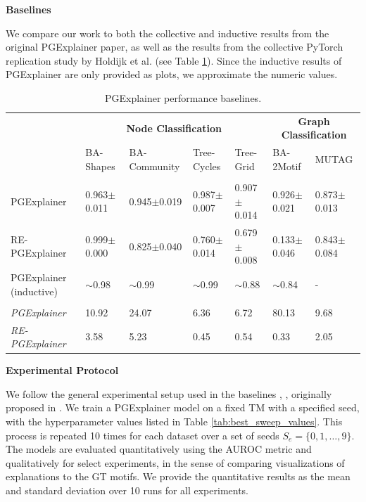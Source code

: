 \textbf{Baselines}\par
 We compare our work to both the collective and inductive results from the original PGExplainer paper, as well as the results from the collective PyTorch replication study by Holdijk et al. \cite{holdijk2021re} (see Table \ref{tab:pgexplainer_baseline}). Since the inductive results of PGExplainer are only provided as plots, we approximate the numeric values. \bigskip

\begin{table}[ht]
    \centering
    \scriptsize
    \begin{tabularx}{\textwidth}{l|XXXX|XX}   %
    \multicolumn{1}{c}{\textbf{}} & \multicolumn{4}{c}{\textbf{Node Classification}} & \multicolumn{2}{c}{\textbf{Graph Classification}} \\
    \textbf{} & BA-Shapes & BA-Community & Tree-Cycles & Tree-Grid & BA-2Motif & MUTAG \\
    \midrule
    \addlinespace
    \multicolumn{7}{c}{\textbf{Explanation AUROC}} \\
    \midrule
    PGExplainer & 0.963$\pm$0.011 & 0.945$\pm$0.019 & 0.987$\pm$0.007 & 0.907$\pm$0.014 & 0.926$\pm$0.021 & 0.873$\pm$0.013 \\
    RE-PGExplainer & 0.999$\pm$0.000 & 0.825$\pm$0.040 & 0.760$\pm$0.014 & 0.679$\pm$0.008 & 0.133$\pm$0.046 & 0.843$\pm$0.084 \\
    PGExplainer (inductive) & $\sim$0.98 & $\sim$0.99 & $\sim$0.99 & $\sim$0.88 & $\sim$0.84 & - \\
    \midrule
    \addlinespace
    \multicolumn{7}{c}{\textbf{Inference Time (ms)}} \\
    \midrule
    \textit{PGExplainer} & 10.92 & 24.07 & 6.36 & 6.72 & 80.13 & 9.68 \\
    \textit{RE-PGExplainer} & 3.58 & 5.23 & 0.45 & 0.54 & 0.33 & 2.05 \\
    \end{tabularx}
    \caption[Baseline PGExplainer and RE-PGExplainer]{PGExplainer performance baselines.}
    \label{tab:pgexplainer_baseline}
\end{table}


\textbf{Experimental Protocol}\par
We follow the general experimental setup used in the baselines \cite{luo2020parameterized}, \cite{holdijk2021re}, originally proposed in \cite{ying2019gnnexplainer}. We train a PGExplainer model on a fixed \ac{TM} with a specified seed, with the hyperparameter values listed in Table \ref{tab:best_sweep_values}. This process is repeated 10 times for each dataset over a set of seeds $S_e=\{0,1,\dots,9\}$. The models are evaluated quantitatively using the AUROC metric and qualitatively for select experiments, in the sense of comparing visualizations of explanations to the \ac{GT} motifs. We provide the quantitative results as the mean and standard deviation over 10 runs for all experiments. \bigskip


